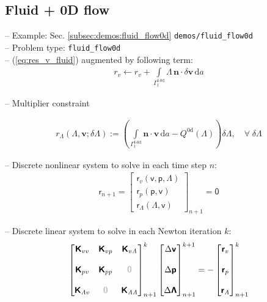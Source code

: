 \documentclass[a4paper,12pt]{report}
\newcommand{\fF}{\text{f}}
\newcommand{\bs}[1]{\boldsymbol{#1}}
\newcommand{\Gm}{\mathit{\Gamma}}
\newcommand{\zerom}{\textcolor{lightgray}{\bs{\mathsf{0}}}}
\newcommand{\ROP}{\bs{\mathsf{r}}}
\newcommand{\LMZ}{\bs{\mathsf{\Lambda}}}
\newcommand{\lmzi}{\mathit{\Lambda}} %
\begin{document}
\subsection{Fluid + 0D flow}\label{subsec:fluid_flow0d}

-- Example: Sec. \ref{subsec:demos:fluid_flow0d} \verb"demos/fluid_flow0d"\\

-- Problem type: \verb.fluid_flow0d.\\

-- (\ref{eq:res_v_fluid}) augmented by following term:
\begin{align}
r_v \leftarrow r_v + \int\limits_{\Gm_t^{\fF\text{-}\mathrm{0d}}}\!\mathit{\Lambda}\,\bs{n}\cdot\delta\bs{v}\,\mathrm{d}a
\end{align}

-- Multiplier constraint

\begin{align}
r_{\mathit{\Lambda}}(\mathit{\Lambda},\bs{v};\delta\mathit{\Lambda}):= \left(\int\limits_{\Gm_t^{\mathrm{\fF\text{-}0d}}}\! \bs{n}\cdot\bs{v}\,\mathrm{d}a - Q^{\mathrm{0d}}(\mathit{\Lambda})\right) \delta\mathit{\Lambda}, \quad \forall \; \delta\mathit{\Lambda}
\end{align}

-- Discrete nonlinear system to solve in each time step $n$:
\begin{align}
\ROP_{n+1} = \begin{bmatrix} \ROP_{v}(\bs{\mathsf{v}},\bs{\mathsf{p}},\LMZ) \\ \ROP_{p}(\bs{\mathsf{p}},\bs{\mathsf{v}}) \\ \ROP_{\mathit{\Lambda}}(\LMZ,\bs{\mathsf{v}}) \end{bmatrix}_{n+1} = \bs{\mathsf{0}}\label{eq:nonlin_sys_fluid_0d}
\end{align}

-- Discrete linear system to solve in each Newton iteration $k$:
\begin{align}
\begin{bmatrix} \bs{\mathsf{K}}_{vv} & \bs{\mathsf{K}}_{vp} & \bs{\mathsf{K}}_{v\lmzi} \\ \\ \bs{\mathsf{K}}_{pv} & \bs{\mathsf{K}}_{pp} & \zerom \\ \\  \bs{\mathsf{K}}_{\lmzi v} & \zerom & \bs{\mathsf{K}}_{\lmzi\lmzi}\end{bmatrix}_{n+1}^{k}\begin{bmatrix} \Delta\bs{\mathsf{v}} \\ \\ \Delta\bs{\mathsf{p}} \\ \\ \Delta\LMZ \end{bmatrix}_{n+1}^{k+1}=-\begin{bmatrix} \ROP_{v} \\ \\ \ROP_{p} \\ \\ \ROP_{\lmzi}\end{bmatrix}_{n+1}^{k} \label{eq:lin_sys_fluid_0d}
\end{align}
\end{document}
